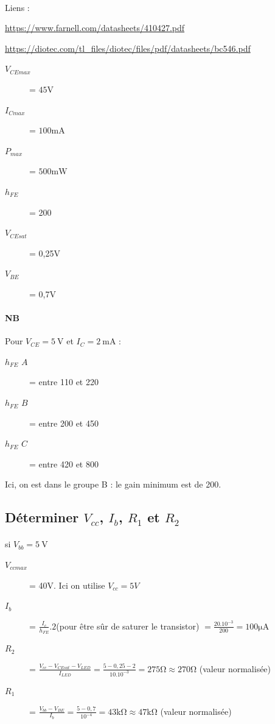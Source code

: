 \documentclass{article}
\begin{document}
\paragraph{}
Liens :
\begin{description}
    \item \url{https://www.farnell.com/datasheets/410427.pdf}
    \item \url{https://diotec.com/tl_files/diotec/files/pdf/datasheets/bc546.pdf}
\end{description}

\begin{description}
    \item[$V_{CE max}$] = $45 \si{\volt}$ 
    \item[$I_{C max}$] = $100 \si{\milli\ampere}$
    \item[$P_{max}$] = $500 \si{\milli\watt}$ %
    \item[$h_{FE}$] = 200 %
    \item[$V_{CE sat}$] = 0,25\si{\volt}
    \item[$V_{BE}$] = 0,7\si{\volt}
\end{description}

\paragraph{NB}
Pour $V_{CE} = \SI{5}{\volt}$ et $I_C = \SI{2}{\milli\ampere}$ :
\begin{description}
    \item[$h_{FE}$ $A$] = entre 110 et 220
    \item[$h_{FE}$ $B$] = entre 200 et 450
    \item[$h_{FE}$ $C$] = entre 420 et 800
\end{description}
Ici, on est dans le groupe B : le gain minimum est de 200.


\subsection{Déterminer $V_{cc}$, $I_b$, $R_1$ et $R_2$}
\paragraph{}si $V_{bb} = \SI{5}{\volt}$

\begin{description}
    \item[$V_{cc max}$] = 40V. Ici on utilise $V_{cc} = 5V$
    \item[$I_b$] = $\frac{I_c}{h_{FE}}.2$(pour être sûr de saturer le transistor) $= \frac{20.10^{-3}}{200} = 100\si{\micro\ampere}$ 
    \item[$R_2$] = $\frac{V_{cc} - V_{CE sat} - V_{LED}}{I_{LED}} = \frac{5 - 0,25 - 2}{10.10^{-3}} = 275\si{\ohm} \approx 270\si{\ohm}$ (valeur normalisée)
    \item[$R_1$] = $\frac{V_{bb} - V_{BE}}{I_{b}} = \frac{5 - 0,7}{10^{-4}} = 43\si{\kilo\ohm} \approx 47\si{\kilo\ohm}$ (valeur normalisée)
\end{description}
\end{document}
